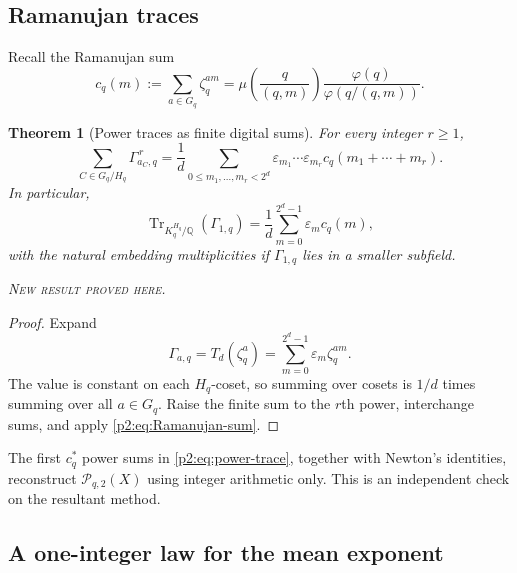 \documentclass[11pt,oneside]{article}
\newtheorem{theorem}{Theorem}[section]
\theoremstyle{definition}
\theoremstyle{remark}
\newcommand{\Q}{\mathbb Q}
\newcommand{\Tr}{\operatorname{Tr}}
\newcommand{\eps}{\varepsilon}
\newcommand{\newresult}{\textcolor{newgreen}{\textsc{New result proved here.}}}
\begin{document}
\subsection{Ramanujan traces}

Recall the Ramanujan sum
\begin{equation}
 c_q(m):=\sum_{a\in G_q}\zeta_q^{am}
 =\mu\!\left(\frac{q}{(q,m)}\right)
 \frac{\varphi(q)}{\varphi(q/(q,m))}.
 \label{p2:eq:Ramanujan-sum}
\end{equation}

\begin{theorem}[Power traces as finite digital sums]\label{p2:thm:Ramanujan-traces}
For every integer $r\ge1$,
\begin{equation}
 \boxed{
 \sum_{C\in G_q/H_q}\Gamma_{a_C,q}^{\,r}
 =\frac1d\sum_{0\le m_1,\ldots,m_r<2^d}
 \eps_{m_1}\cdots\eps_{m_r}
 c_q(m_1+\cdots+m_r).}
 \label{p2:eq:power-trace}
\end{equation}
In particular,
\begin{equation}
 \Tr_{K_q^{H_q}/\Q}(\Gamma_{1,q})
 =\frac1d\sum_{m=0}^{2^d-1}\eps_mc_q(m),
 \label{p2:eq:first-trace}
\end{equation}
with the natural embedding multiplicities if $\Gamma_{1,q}$ lies in a smaller
subfield.

\smallskip\noindent\newresult
\end{theorem}

\begin{proof}
Expand
\[
 \Gamma_{a,q}=T_d(\zeta_q^a)=\sum_{m=0}^{2^d-1}\eps_m\zeta_q^{am}.
\]
The value is constant on each $H_q$-coset, so summing over cosets is $1/d$ times
summing over all $a\in G_q$. Raise the finite sum to the $r$th power, interchange
sums, and apply \eqref{p2:eq:Ramanujan-sum}.
\end{proof}

\begin{corollary}\label{p2:cor:Newton-reconstruction}
The first $c_q^*$ power sums in \eqref{p2:eq:power-trace}, together with Newton's
identities, reconstruct $\mathscr P_{q,2}(X)$ using integer arithmetic only.
This is an independent check on the resultant method.
\end{corollary}

\subsection{A one-integer law for the mean exponent}
\end{document}
